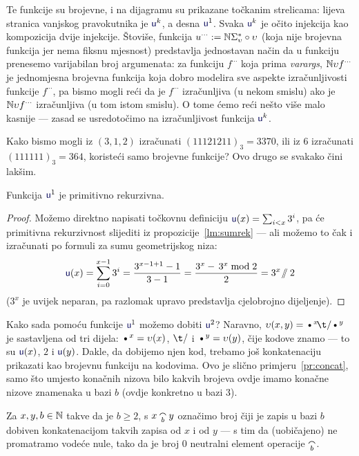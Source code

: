 Te funkcije su brojevne, i na dijagramu su prikazane točkanim strelicama: lijeva stranica vanjskog pravokutnika je $\f u^k$, a desna $\f u^1$. Svaka $\f u^k$ je očito injekcija kao kompozicija dvije injekcije. Štoviše, funkcija $u^{\cdots}:={\mathbb N}\Sigma_\upsilon^*\circ\upsilon$ (koja nije brojevna funkcija jer nema fiksnu mjesnost) predstavlja jednostavan način da u funkciju prenesemo varijabilan broj argumenata: za funkciju $f^{\cdots}$ koja prima \emph{varargs}, ${\mathbb N}\upsilon f^{\cdots}$ je jednomjesna brojevna funkcija koja dobro modelira sve aspekte izračunljivosti funkcije $f^{\cdots}$, pa bismo mogli reći da je $f^{\cdots}$ izračunljiva (u nekom smislu) ako je ${\mathbb N}\upsilon f^{\cdots}$ izračunljiva (u tom istom smislu). O tome ćemo reći nešto više malo kasnije --- zasad se usredotočimo na izračunljivost funkcija $\f u^k$.

Kako bismo mogli iz $(3,1,2)$ izračunati $(11121211)_3=3370$, ili iz $6$ izračunati $(111111)_3=364$, koristeći samo brojevne funkcije? Ovo drugo se svakako čini lakšim.

\begin{lema}\label{lm:u1prn}
Funkcija $\f u^1$ je primitivno rekurzivna.
\end{lema}
\begin{proof}
Možemo direktno napisati točkovnu definiciju $\f u(x)=\sum_{i<x}3^i$, pa će primitivna rekurzivnost slijediti iz propozicije~\ref{lm:sumrek} --- ali možemo to čak i izračunati po formuli za sumu geometrijskog niza:
\begin{equation}\label{eq:u1prn}
    \f u(x)=\sum_{i=0}^{x-1}3^i=\frac{3^{x-1+1}-1}{3-1}=\frac{3^x-\,3^x\bmod 2}{2}=3^x\!\sslash2
\end{equation}
($3^x$ je uvijek neparan, pa razlomak upravo predstavlja cjelobrojno dijeljenje).
\end{proof}

Kako sada pomoću funkcije $\f u^1$ možemo dobiti $\f u^2$? Naravno, $\upsilon(x,y)=\text\textbullet^x\!\t/\text\textbullet^y$ je sastavljena od tri dijela: $\text\textbullet^x=\upsilon(x)$, $\t/$ i $\text\textbullet^y=\upsilon(y)$, čije kodove znamo --- to su $\f u(x)$, $2$ i $\f u(y)$. Dakle, da dobijemo njen kod, trebamo još konkatenaciju prikazati kao brojevnu funkciju na kodovima. Ovo je slično primjeru~\ref{pr:concat}, samo što umjesto konačnih nizova bilo kakvih brojeva ovdje imamo konačne nizove znamenaka u bazi $b$ (ovdje konkretno u bazi $3$).

\begin{definicija}
Za $x,y,b\in{\mathbb N}$ takve da je $b\ge 2$, s $x\conc by$ označimo broj čiji je zapis u bazi $b$ dobiven konkatenacijom takvih zapisa od $x$ i od $y$ --- s tim da (uobičajeno) ne promatramo vodeće nule, tako da je broj $0$ neutralni element operacije $\conc b$.
\end{definicija}

